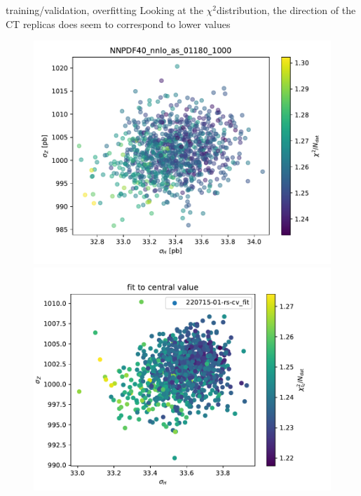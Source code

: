 \documentclass[aspectratio=169,10pt]{beamer}
\newcommand{\chitwo}{$\chi^2$}
\begin{document}
\begin{frame}[t]{training/validation, overfitting}
  Looking at the \chitwo distribution, the direction of the CT replicas does seem to correspond to lower values
  \begin{figure}
    \centering
    \includegraphics[height=.55\textheight]{nnpdf40_chi2_scatter.pdf}
    \includegraphics[height=.55\textheight]{chi2_fit_to_central_value.pdf}
  \end{figure}
\end{frame}
\end{document}
